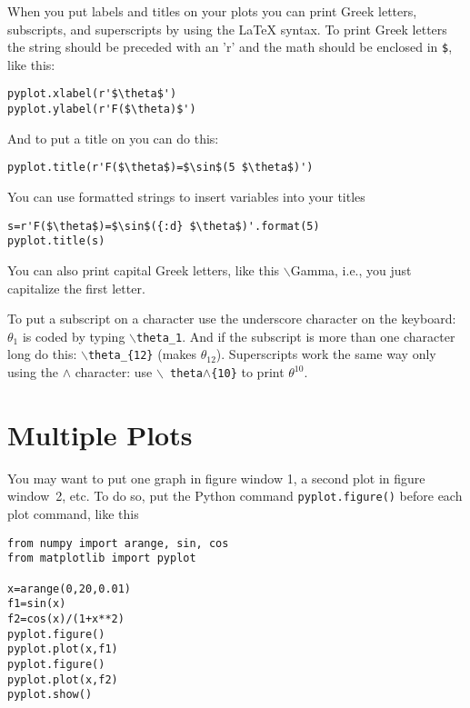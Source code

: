   When you put
labels and titles on your plots you can print Greek letters,
subscripts, and superscripts by using the LaTeX syntax. To print
Greek letters the string should be preceded with an 'r' and the math
should be enclosed in \texttt{\$}, like
this:
\begin{Verbatim}
pyplot.xlabel(r'$\theta$')
pyplot.ylabel(r'F($\theta)$')
\end{Verbatim}
And to put a title on you can do this:
\begin{Verbatim}
pyplot.title(r'F($\theta$)=$\sin$(5 $\theta$)')
\end{Verbatim}
You can use formatted strings to insert variables into your titles
\begin{Verbatim}
s=r'F($\theta$)=$\sin$({:d} $\theta$)'.format(5)
pyplot.title(s)
\end{Verbatim}
 
You can also print capital Greek letters, like this
$\backslash$Gamma, i.e., you just capitalize the first letter.

 To put a subscript on a character
use the underscore character on the keyboard: $\theta_1$ is coded
by typing $\backslash${\tt theta\_1}. And if the subscript is more
than one character long do this: $\backslash${\tt theta\_\{12\}}
(makes $\theta_{12}$). Superscripts work the same way only using
the {\tt $\wedge$} character: use $\backslash${\tt
theta$\wedge$\{10\}} to print $\theta^{10}$.

\section{Multiple Plots}

  You may want to put
one graph in figure window 1, a second plot in figure window~2,
etc. To do so, put the Python command {\tt pyplot.figure()} before each plot
command, like this
\begin{Verbatim}
from numpy import arange, sin, cos
from matplotlib import pyplot

x=arange(0,20,0.01)
f1=sin(x)
f2=cos(x)/(1+x**2)
pyplot.figure()
pyplot.plot(x,f1)
pyplot.figure()
pyplot.plot(x,f2)
pyplot.show()
\end{Verbatim}

